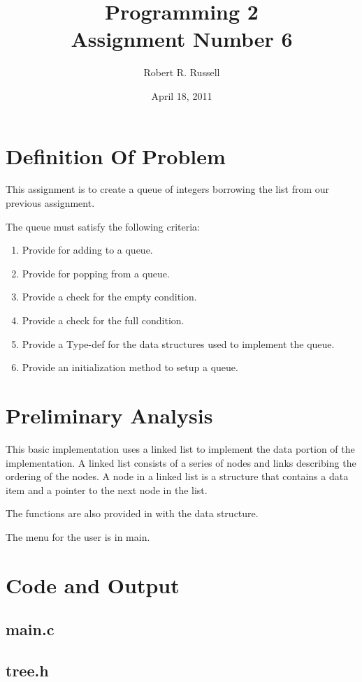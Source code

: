 \documentclass[letterpaper,oneside]{scrartcl}
\title{Programming 2\\Assignment Number 6}
\author{Robert R. Russell}
\date{April 18, 2011}
\begin{document}
\maketitle

\section{Definition Of Problem}
This assignment is to create a queue of integers borrowing the list from our
previous assignment.

The queue must satisfy the following criteria:
\begin{enumerate}
\item Provide for adding to a queue.
\item Provide for popping from a queue.
\item Provide a check for the empty condition.
\item Provide a check for the full condition.
\item Provide a Type-def for the data structures used to implement the queue.
\item Provide an initialization method to setup a queue.
\end{enumerate}

\section{Preliminary Analysis}

This basic implementation uses a linked list to implement the data portion of the implementation.
A linked list consists of a series of nodes and links describing the ordering of the nodes.
A node in a linked list is a structure that contains a data item and a pointer to the next node in the list.

The functions are also provided in with the data structure.

The menu for the user is in main.

\section{Code and Output}

\subsection{main.c}

\subsection{tree.h}
\end{document}
